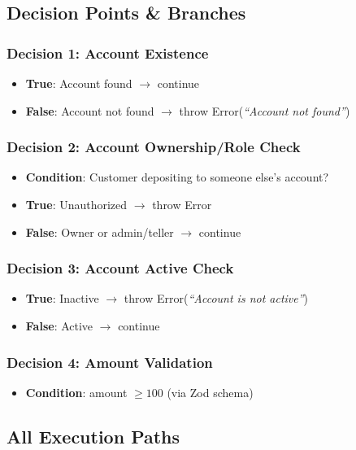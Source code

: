 \subsection{Decision Points \& Branches}

\subsubsection{Decision 1: Account Existence}
\begin{itemize}
    \item \textbf{True}: Account found $\rightarrow$ continue
    \item \textbf{False}: Account not found $\rightarrow$ throw Error(\textit{``Account not found''})
\end{itemize}

\subsubsection{Decision 2: Account Ownership/Role Check}
\begin{itemize}
    \item \textbf{Condition}: Customer depositing to someone else's account?
    \item \textbf{True}: Unauthorized $\rightarrow$ throw Error
    \item \textbf{False}: Owner or admin/teller $\rightarrow$ continue
\end{itemize}

\subsubsection{Decision 3: Account Active Check}
\begin{itemize}
    \item \textbf{True}: Inactive $\rightarrow$ throw Error(\textit{``Account is not active''})
    \item \textbf{False}: Active $\rightarrow$ continue
\end{itemize}

\subsubsection{Decision 4: Amount Validation}
\begin{itemize}
    \item \textbf{Condition}: amount $\geq 100$ (via Zod schema)
\end{itemize}

\subsection{All Execution Paths}

